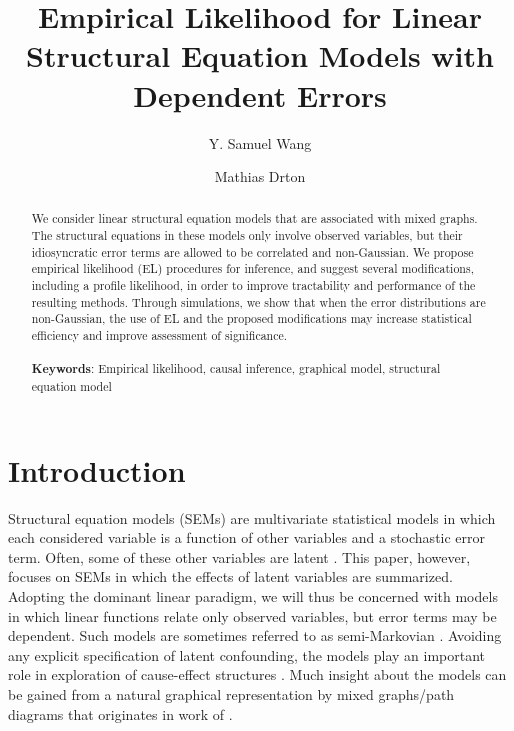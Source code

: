 \documentclass[notitlepage]{article}
\begin{document}
\title{Empirical Likelihood for Linear Structural Equation Models with Dependent Errors}

\author[1]{Y. Samuel Wang}
\author[1]{Mathias Drton}




\maketitle


\begin{abstract}
  We consider linear structural equation models that are associated with
  mixed graphs.  The structural equations in these models only involve
  observed variables, but their idiosyncratic error terms are allowed
  to be correlated and non-Gaussian.  We propose empirical likelihood
  (EL) procedures for inference, and suggest several modifications,
  including a profile likelihood, in order to improve tractability and
  performance of the resulting methods.  Through simulations, we show that
  when the error distributions are non-Gaussian, the use of EL and the
  proposed modifications may increase statistical efficiency and
  improve assessment of significance.
  \\ \\
  \textbf{Keywords}: Empirical likelihood, causal inference, graphical model,
     structural equation model
\end{abstract}

\section{Introduction}

Structural equation models (SEMs) are multivariate statistical models
in which each considered variable is a function of other variables and
a stochastic error term.  Often, some of these other variables are
latent \citep{bollen2014structural}.  This paper, however, focuses on
SEMs in which the effects of latent variables are summarized.
Adopting the dominant linear paradigm, we will thus be concerned with
models in which linear functions relate only observed variables, but
error terms may be dependent.  Such models are sometimes referred to
as semi-Markovian \citep{shpitser2006identification}.  Avoiding any
explicit specification of latent confounding, the models play an
important role in exploration of cause-effect structures
\citep{colombo:2012,pearl:2009,richardson:2002,spirtes2000causation,wermuth:2011}.
Much insight about the models can be gained from a natural graphical
representation by mixed graphs/path diagrams that originates in work
of \cite{wright1921correlation}.
\end{document}
